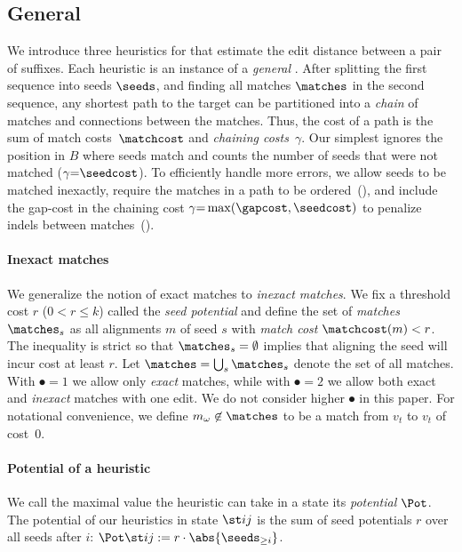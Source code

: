\subsection{General \csh}\label{sec:heuristic}

We introduce three heuristics for \A that estimate the edit distance between a
pair of suffixes. Each heuristic is an instance of a \emph{general \csh}. After
splitting the first sequence into seeds $\seeds$, and finding all matches
$\matches$ in the second sequence, any shortest path to the target can be
partitioned into a \emph{chain} of matches and connections between the matches.
Thus, the cost of a path is the sum of match costs~$\matchcost$ and
\emph{chaining costs}~$\gamma$. Our simplest \sh ignores the position in $B$
where seeds match and counts the number of seeds that were not matched
($\gamma{=}\seedcost$). To efficiently handle more errors, we allow seeds to be
matched inexactly, require the matches in a path to be ordered~(\CSH), and
include the gap-cost in the chaining cost ${\gamma {=} \max(\gapcost,
\seedcost)}$ to penalize indels between matches~(\GCH).

\paragraph{Inexact matches}
We generalize the notion of exact matches to \emph{inexact matches}. We fix a
threshold cost $r$ ($0{<}r{\leq}k$) called the \emph{seed potential} and define
the set of \emph{matches} $\matches_s$ as all alignments $m$ of seed $s$ with
\emph{match cost} ${\matchcost(m) < r}$. The inequality is strict so that
$\matches_s=\emptyset$ implies that aligning the seed will incur cost at least
$r$. Let $\matches = \bigcup_s \matches_s$ denote the set of all matches. With
$\spot{=}1$ we allow only \emph{exact} matches, while with $\spot{=}2$ we allow
both exact and \emph{inexact} matches with one edit. We do not consider higher
$\spot$ in this paper. For notational convenience, we define $m_\omega \not\in
\matches$ to be a match from $v_t$ to $v_t$ of cost~$0$.

\paragraph{Potential of a heuristic}
We call the maximal value the heuristic can take in a state its \emph{potential}
$\Pot$. The potential of our heuristics in state $\st ij$ is the sum of seed
potentials $r$ over all seeds after $i$: ${\Pot\st ij := r\cdot
\abs{\seeds_{\geq i}}}$.


